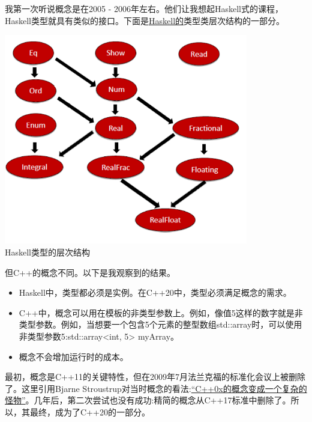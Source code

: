 
我第一次听说概念是在2005 - 2006年左右。他们让我想起Haskell式的课程，Haskell类型就具有类似的接口。下面是\href{https://en.wikipedia.org/wiki/Haskell_(programming_language)}{Haskell的}类型类层次结构的一部分。

\begin{center}
\includegraphics[width=0.8\textwidth]{content/3/chapter4/images/7.png}\\
Haskell类型的层次结构
\end{center}

但C++的概念不同。以下是我观察到的结果。

\begin{itemize}
\item 
Haskell中，类型都必须是实例。在C++20中，类型必须满足概念的需求。

\item 
C++中，概念可以用在模板的非类型参数上。例如，像值5这样的数字就是非类型参数。例如，当想要一个包含5个元素的整型数组std::array时，可以使用非类型参数5:std::array<int, 5> myArray。

\item 
概念不会增加运行时的成本。
\end{itemize}

最初，概念是C++11的关键特性，但在2009年7月法兰克福的标准化会议上被删除了。这里引用Bjarne Stroustrup对当时概念的看法:\href{https://isocpp.org/blog/2013/02/concepts-lite-constraining-templates-with-predicates-andrew-sutton-bjarne-s}{“C++0x的概念变成一个复杂的怪物”}。几年后，第二次尝试也没有成功:精简的概念从C++17标准中删除了。所以，其最终，成为了C++20的一部分。

